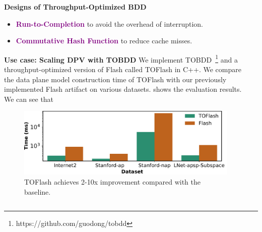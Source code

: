 \documentclass[final]{beamer}
\newcommand{\system}{TOBDD\xspace}
\newcommand{\efsz}[1]{\textcolor{purple}{\textbf{#1}}}
\newlength{\sepwidthB}
\newlength{\colwidthB}
\newcommand{\separatorcolumnB}{\begin{column}{\sepwidthB}\end{column}}
\begin{document}
\begin{frame}[t]
\begin{columns}
\begin{column}[T]{\colwidthB}
\begin{block}{\Large{\textbf{Designs of Throughput-Optimized BDD}}}
\begin{itemize}
    \item {\efsz{Run-to-Completion} to avoid the overhead of interruption.}

    \item {\efsz{Commutative Hash Function} to reduce cache misses.}

  \end{itemize}
\end{block}

\vspace{-0.5cm}
\begin{block}{\Large{\textbf{Use case: Scaling DPV with TOBDD}}}
\vspace{0.9cm}
\large
We implement \system~\footnote{https://github.com/guodong/tobdd} and 
a throughput-optimized version of Flash called TOFlash in C++. 
We compare the data plane model construction time of TOFlash with 
our previously implemented Flash artifact on various datasets.
 shows the evaluation results. We can see that 
\end{block}

\begin{figure}
\centering
\includegraphics[width=1\textwidth]{figures/toflash.pdf}
\caption{TOFlash achieves 2-10x improvement compared with the baseline.}
\label{fig:eval}
\end{figure}

\end{column}
\separatorcolumnB
\end{columns}




\end{frame}
\end{document}
